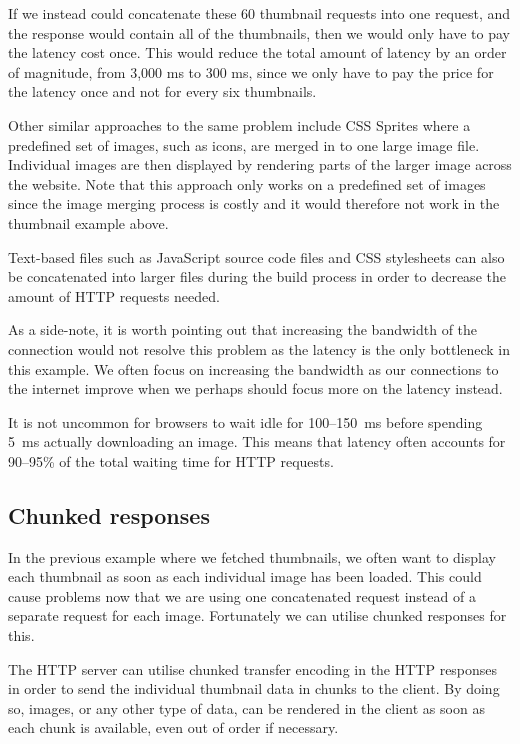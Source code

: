 \documentclass{cslthse-msc}
\begin{document}
If we instead could concatenate these 60 thumbnail requests into one request, and the response would contain all of the thumbnails, then we would only have to pay the latency cost once. This would reduce the total amount of latency by an order of magnitude, from 3,000 ms to 300 ms, since we only have to pay the price for the latency once and not for every six thumbnails.

Other similar approaches to the same problem include CSS Sprites\cite{css_sprites} where a predefined set of images, such as icons, are merged in to one large image file. Individual images are then displayed by rendering parts of the larger image across the website. Note that this approach only works on a predefined set of images since the image merging process is costly and it would therefore not work in the thumbnail example above.

Text-based files such as JavaScript source code files and CSS stylesheets can also be concatenated into larger files during the build process in order to decrease the amount of HTTP requests needed\cite{js_concat}.

As a side-note, it is worth pointing out that increasing the bandwidth of the connection would not resolve this problem as the latency is the only bottleneck in this example. We often focus on increasing the bandwidth as our connections to the internet improve when we perhaps should focus more on the latency instead.

It is not uncommon for browsers to wait idle for 100--150~ms before spending 5~ms actually downloading an image. This means that latency often accounts for 90--95\% of the total waiting time for HTTP requests\cite{latency}. 

\subsection{Chunked responses}
In the previous example where we fetched thumbnails, we often want to display each thumbnail as soon as each individual image has been loaded. This could cause problems now that we are using one concatenated request instead of a separate request for each image. Fortunately we can utilise chunked responses for this.

The HTTP server can utilise chunked transfer encoding in the HTTP responses in order to send the individual thumbnail data in chunks to the client\cite{chunked}. By doing so, images, or any other type of data, can be rendered in the client as soon as each chunk is available, even out of order if necessary. 
\end{document}
